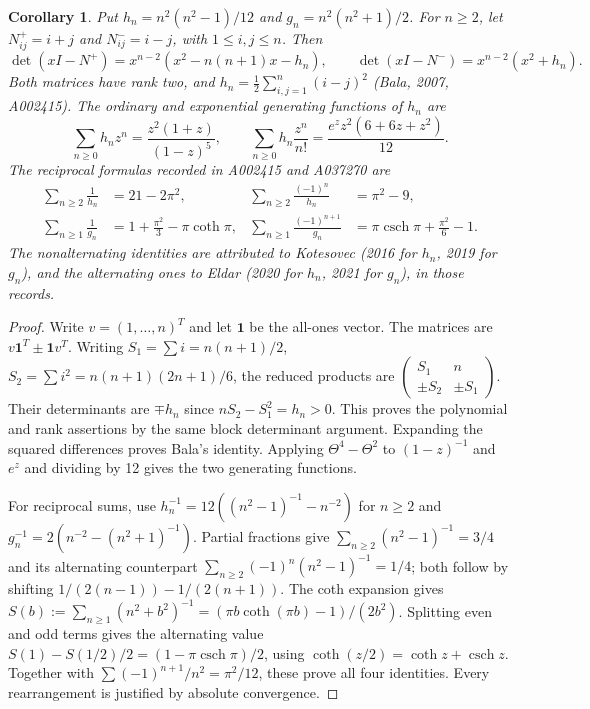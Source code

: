 \documentclass[11pt]{article}
\newtheorem{corollary}[theorem]{Corollary}
\begin{document}
\begin{corollary}\label{cor:linked}
Put $h_n=n^2(n^2-1)/12$ and $g_n=n^2(n^2+1)/2$. For $n\geq2$, let
$N^+_{ij}=i+j$ and $N^-_{ij}=i-j$, with $1\leq i,j\leq n$. Then
\[
\det(xI-N^+)=x^{n-2}(x^2-n(n+1)x-h_n),\qquad
\det(xI-N^-)=x^{n-2}(x^2+h_n).
\]
Both matrices have rank two, and
$h_n=\tfrac12\sum_{i,j=1}^n(i-j)^2$ (Bala, 2007, A002415).
The ordinary and exponential generating functions of $h_n$ are
\[
\sum_{n\geq0}h_nz^n=\frac{z^2(1+z)}{(1-z)^5},\qquad
\sum_{n\geq0}h_n\frac{z^n}{n!}
=\frac{e^zz^2(6+6z+z^2)}{12}.
\]
The reciprocal formulas recorded in A002415 and A037270 are
\begin{align*}
\sum_{n\geq2}\frac1{h_n}&=21-2\pi^2,&
\sum_{n\geq2}\frac{(-1)^n}{h_n}&=\pi^2-9,\\
\sum_{n\geq1}\frac1{g_n}&=1+\frac{\pi^2}{3}-\pi\coth\pi,&
\sum_{n\geq1}\frac{(-1)^{n+1}}{g_n}
&=\pi\operatorname{csch}\pi+\frac{\pi^2}{6}-1.
\end{align*}
The nonalternating identities are attributed to Kotesovec (2016 for $h_n$,
2019 for $g_n$), and the alternating ones to Eldar (2020 for $h_n$,
2021 for $g_n$), in those records.
\end{corollary}
\begin{proof}
Write $v=(1,\ldots,n)^T$ and let $\mathbf1$ be the all-ones vector.
The matrices are $v\mathbf1^T\pm\mathbf1v^T$.
Writing $S_1=\sum i=n(n+1)/2$, $S_2=\sum i^2=n(n+1)(2n+1)/6$,
the reduced products are
$\left(\begin{smallmatrix}S_1&n\\ \pm S_2&\pm S_1\end{smallmatrix}\right)$.
Their determinants are $\mp h_n$ since $nS_2-S_1^2=h_n>0$.
This proves the polynomial and rank assertions by the same block
determinant argument. Expanding the squared differences proves Bala's
identity. Applying $\Theta^4-\Theta^2$ to $(1-z)^{-1}$ and $e^z$
and dividing by 12 gives the two generating functions.

For reciprocal sums, use
$h_n^{-1}=12((n^2-1)^{-1}-n^{-2})$ for $n\geq2$ and
$g_n^{-1}=2(n^{-2}-(n^2+1)^{-1})$.
Partial fractions give $\sum_{n\geq2}(n^2-1)^{-1}=3/4$ and its
alternating counterpart $\sum_{n\geq2}(-1)^n(n^2-1)^{-1}=1/4$;
both follow by shifting $1/(2(n-1))-1/(2(n+1))$.
The coth expansion gives
$S(b):=\sum_{n\geq1}(n^2+b^2)^{-1}
=(\pi b\coth(\pi b)-1)/(2b^2)$.
Splitting even and odd terms gives the alternating value
$S(1)-S(1/2)/2=(1-\pi\operatorname{csch}\pi)/2$,
using $\coth(z/2)=\coth z+\operatorname{csch}z$.
Together with $\sum(-1)^{n+1}/n^2=\pi^2/12$, these prove all four
identities. Every rearrangement is justified by absolute convergence.
\end{proof}
\end{document}

